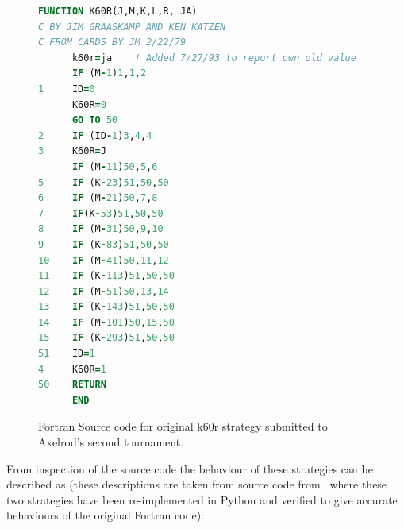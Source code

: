 \documentclass{article}
\begin{document}
\begin{figure}[!hbtp]
    \begin{center}
        \begin{lstlisting}[language=Fortran,
                           basicstyle=\ttfamily,
                           frame=single,
                           keywordstyle=\color{red},
                           commentstyle=\color{green}]
      FUNCTION K60R(J,M,K,L,R, JA)
C BY JIM GRAASKAMP AND KEN KATZEN
C FROM CARDS BY JM 2/22/79
      k60r=ja    ! Added 7/27/93 to report own old value
      IF (M-1)1,1,2
1     ID=0
      K60R=0
      GO TO 50
2     IF (ID-1)3,4,4
3     K60R=J
      IF (M-11)50,5,6
5     IF (K-23)51,50,50
6     IF (M-21)50,7,8
7     IF(K-53)51,50,50
8     IF (M-31)50,9,10
9     IF (K-83)51,50,50
10    IF (M-41)50,11,12
11    IF (K-113)51,50,50
12    IF (M-51)50,13,14
13    IF (K-143)51,50,50
14    IF (M-101)50,15,50
15    IF (K-293)51,50,50
51    ID=1
4     K60R=1
50    RETURN
      END
        \end{lstlisting}
        \caption{Fortran Source code for original k60r strategy submitted
        to Axelrod's second tournament.}
        \label{fig:k60r_fortran}
    \end{center}
\end{figure}

From inspection of the source code the behaviour of these strategies can be
described as (these descriptions are taken from source code
from~\cite{AxelrodProject} where these two strategies have been re-implemented
in Python and verified to give accurate behaviours of the original Fortran
code):
\end{document}
